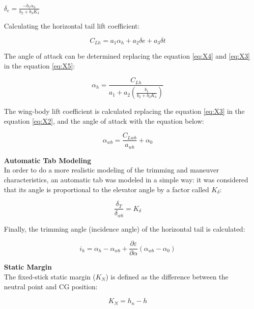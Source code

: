 \begin{center}
    $\delta_{e}=\frac{-b_{1}\alpha_{h}}{b_{2}+b_{3}K_{\delta}}$
\end{center}

Calculating the horizontal tail lift coefficient:

\begin{equation}
    C_{Lh}=a_{1}\alpha_{h}+a_{2}\delta{e}+a_{3}\delta{t}
    \label{eq:X5}
\end{equation}

The angle of attack can be determined replacing the equation \ref{eq:X4} and \ref{eq:X3} in the equation \ref{eq:X5}:

\begin{equation}
    \alpha_{h}=\frac{C_{Lh}}{a_{1}+a_{2}(\frac{b_{1}}{b_{2}+b_{3}K_{\delta}})}
    \label{eq:X6}
\end{equation}

The wing-body lift coefficient is calculated replacing the equation \ref{eq:X3} in the equation \ref{eq:X2}, and the angle of attack with the equation below:

\begin{equation}
    \alpha_{wb}=\frac{C_{Lwb}}{a_{wb}}+\alpha_{0}
    \label{eq:X7}
\end{equation}

\textbf{Automatic Tab Modeling}
\\
In order to do a more realistic modeling of the trimming and maneuver characteristics, an automatic tab was modeled in a simple way: it was considered that its angle is proportional to the elevator angle by a factor called $K_{\delta}$:

\begin{equation}
    \frac{\delta_{T}}{\delta_{wb}}=K_{\delta}
    \label{eq:X1}
\end{equation}

Finally, the trimming angle (incidence angle) of the horizontal tail is calculated:

\begin{equation}
    i_{h}=\alpha_{h}-\alpha_{wb}+\frac{\partial\varepsilon}{\partial\alpha}(\alpha_{wb}-\alpha_{0})
    \label{eq:X8}
\end{equation}

\textbf{Static Margin}
\\
The fixed-stick static margin ($K_{N}$) is defined as the difference between the neutral point and CG position:

\begin{equation}
    K_{N}=h_{n}-h
    \label{eq:X9}
\end{equation}

